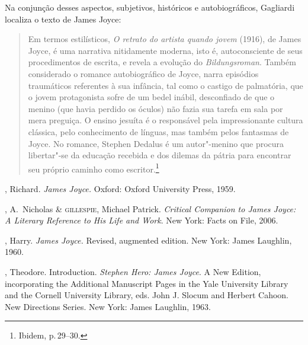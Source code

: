 Na conjunção desses aspectos, subjetivos, históricos e autobiográficos, Gagliardi localiza o texto de James Joyce:

\begin{quote}
Em termos estilísticos, \textit{O retrato do
artista quando jovem} (1916), de James Joyce, é uma
narrativa nitidamente moderna, isto é, autoconsciente de seus
procedimentos de escrita, e revela a evolução do
\textit{Bildungsroman}. Também considerado o
romance autobiográfico de Joyce, narra episódios traumáticos referentes
à sua infância, tal como o castigo de palmatória, que o jovem
protagonista sofre de um bedel inábil, desconfiado de que o menino (que
havia perdido os óculos) não fazia sua tarefa em sala por mera
preguiça. O ensino jesuíta é o responsável pela impressionante cultura
clássica, pelo conhecimento de línguas, mas também pelos fantasmas de
Joyce. No romance, Stephen Dedalus é um autor"-menino que procura
libertar"-se da educação recebida e dos dilemas da pátria para
encontrar seu próprio caminho como
escritor.\footnote{Ibidem, p.\,29--30.}
\end{quote}

\begin{bibliohedra}

, Richard.  \textit{James Joyce.}  Oxford: Oxford University
Press, 1959.

, A.~Nicholas \& \textsc{gillespie}, Michael Patrick. 
\textit{Critical Companion to James Joyce: A Literary Reference to His Life and Work}.
New York: Facts on File, 2006.

, Harry.  \textit{James Joyce.}  Revised, augmented edition.  New
York: James Laughlin, 1960.

, Theodore.  Introduction.  \textit{Stephen Hero: James Joyce}. 
A New Edition, incorporating the Additional Manuscript Pages in the Yale
University Library and the Cornell University Library, eds. John J.
Slocum and Herbert Cahoon.  New Directions Series.  New York: James
Laughlin, 1963.

\end{bibliohedra}
